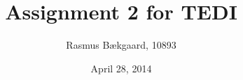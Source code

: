 





\usepackage[left=3cm,right=2cm,top=2.5cm,bottom=2cm]{geometry}

\linespread{1.5}

\title{Assignment 2 for TEDI}
\author{Rasmus Bækgaard, 10893}
\date{April 28, 2014}